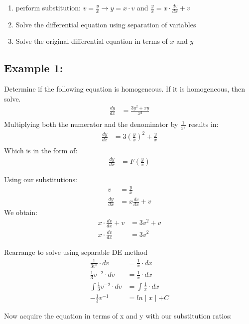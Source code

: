 \documentclass{article}
\begin{document}
\begin{flushleft}
{\begin{enumerate}
\item perform substitution: $ v = \frac{y}{x} \rightarrow y = x \cdot v$ and $\frac{y}{x} = x \cdot \frac{dv}{dx} + v $
\item Solve the differential equation using separation of variables
\item Solve the original differential equation in terms of $x$ and $y$
\end{enumerate}
\bigskip
\subsection*{\textbf{Example 1:}}
Determine if the following equation is homogeneous. If it is homogeneous, then solve.
\begin{align*}
\frac{dy}{dx} & = \frac{3y^2 +xy}{x^2}\\
\end{align*}
Multiplying both the numerator and the denominator by $\frac{1}{x^2}$ results in:
\begin{align*}
\frac{dy}{dx} & = 3(\frac{y}{x})^2+\frac{y}{x}\\
\end{align*}
Which is in the form of:
\begin{align*}
\frac{dy}{dx} & = F (\frac{y}{x})
\end{align*}

Using our substitutions:
\begin{align*}
v & = \frac{y}{x}\\
\frac{dy}{dx} & = x \frac{dv}{dx} + v
 \end{align*}
We obtain:
\begin{align*}
x \cdot \frac{dv}{dx} + v & = 3v^2 + v\\
x \cdot  \frac{dv}{dx}  & = 3v^2 
\end{align*}

Rearrange to solve using separable DE method
\begin{align*}
\frac{1}{3v^2} \cdot dv & = \frac{1}{x} \cdot dx \\
\frac{1}{3} v^{-2} \cdot dv & = \frac{1}{x} \cdot dx \\
\int \frac{1}{3} v^{-2} \cdot dv & = \int \frac{1}{x} \cdot dx  \\
-\frac{1}{3}v^{-1} & = ln\mid x \mid + C
\end{align*}

Now acquire the equation in terms of x and y with our substitution ratios:

}
\end{flushleft}
\end{document}

